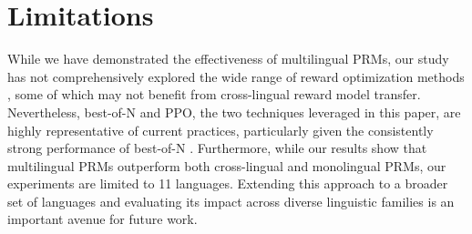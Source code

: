 \section{Limitations}
\label{sec:limitations}


While we have demonstrated the effectiveness of multilingual PRMs, our study has not comprehensively explored the wide range of reward optimization methods \citep{limit1,limit2}, some of which may not benefit from cross-lingual reward model transfer. Nevertheless, best-of-N and PPO, the two techniques leveraged in this paper, are highly representative of current practices, particularly given the consistently strong performance of best-of-N \citep{limit3,limit1,limit4}.
Furthermore, while our results show that multilingual PRMs outperform both cross-lingual and monolingual PRMs, our experiments are limited to 11 languages. Extending this approach to a broader set of languages and evaluating its impact across diverse linguistic families is an important avenue for future work.